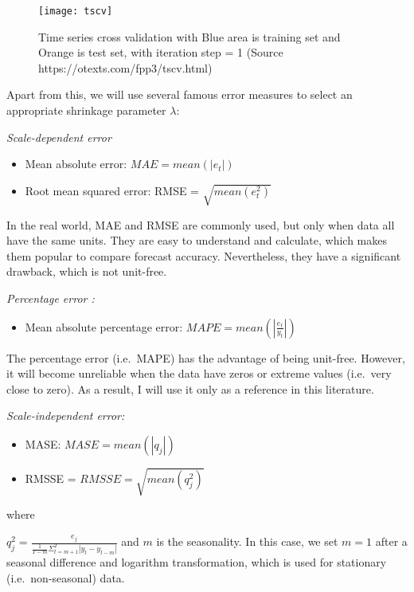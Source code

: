 \documentclass{monashthesis}
\begin{document}
\graphicspath{ {/Users/elvisyang/Desktop/hon_proj/Disaggregated_Employment/Honours_thesis/figures} }

\begin{figure}[t]
\texttt{[image: tscv]}
\centering
\caption{Time series cross validation with Blue area is training set and Orange is test set, with iteration step = 1 (Source https://otexts.com/fpp3/tscv.html)}
\label{fig:tscv}
\end{figure}

Apart from this, we will use several famous error measures to select an appropriate shrinkage parameter \(\lambda\):

\emph{Scale-dependent error}

\begin{itemize}
\item
  Mean absolute error: \(MAE = mean(|e_t|)\)
\item
  Root mean squared error: RMSE = \(\sqrt{mean(e_t^2)}\)
\end{itemize}

In the real world, MAE and RMSE are commonly used, but only when data all have the same units. They are easy to understand and calculate, which makes them popular to compare forecast accuracy. Nevertheless, they have a significant drawback, which is not unit-free.

\emph{Percentage error :}

\begin{itemize}
\tightlist
\item
  Mean absolute percentage error: \(MAPE = mean(|\frac{e_t}{y_t}|)\)
\end{itemize}

The percentage error (i.e.~MAPE) has the advantage of being unit-free. However, it will become unreliable when the data have zeros or extreme values (i.e.~very close to zero). As a result, I will use it only as a reference in this literature.

\emph{Scale-independent error:}

\begin{itemize}
\item
  MASE: \(MASE = mean(|q_j|)\)
\item
  RMSSE = \(RMSSE=\sqrt{mean(q_j^2)}\)
\end{itemize}

where

\(q_j^2=\frac{e_j}{\frac{1}{T-m}\Sigma^T_{t=m+1}|y_t-y_{t-m}|}\) and \(m\) is the seasonality. In this case, we set \(m=1\) after a seasonal difference and logarithm transformation, which is used for stationary (i.e.~non-seasonal) data.
\end{document}
